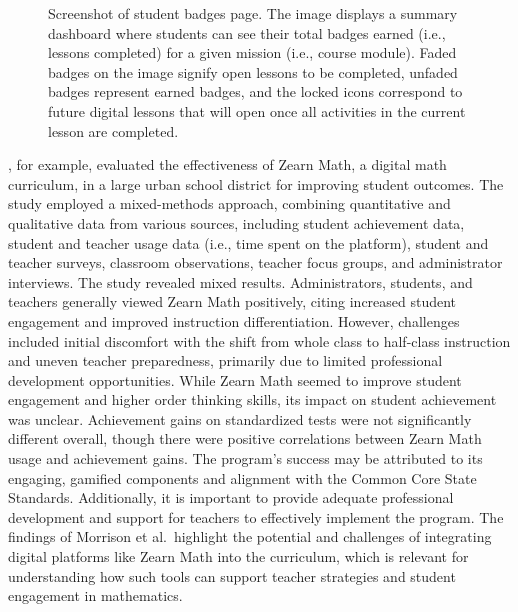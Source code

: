 \documentclass[
  number,
  preprint,
  3p,
  onecolumn]{elsarticle}
\begin{document}
\begin{figure}


\caption{\label{fig-badges-screen}Screenshot of student badges page. The
image displays a summary dashboard where students can see their total
badges earned (i.e., lessons completed) for a given mission (i.e.,
course module). Faded badges on the image signify open lessons to be
completed, unfaded badges represent earned badges, and the locked icons
correspond to future digital lessons that will open once all activities
in the current lesson are completed.}

\end{figure}%

\citep{morrison2019}, for example, evaluated the effectiveness of Zearn
Math, a digital math curriculum, in a large urban school district for
improving student outcomes. The study employed a mixed-methods approach,
combining quantitative and qualitative data from various sources,
including student achievement data, student and teacher usage data
(i.e., time spent on the platform), student and teacher surveys,
classroom observations, teacher focus groups, and administrator
interviews. The study revealed mixed results. Administrators, students,
and teachers generally viewed Zearn Math positively, citing increased
student engagement and improved instruction differentiation. However,
challenges included initial discomfort with the shift from whole class
to half-class instruction and uneven teacher preparedness, primarily due
to limited professional development opportunities. While Zearn Math
seemed to improve student engagement and higher order thinking skills,
its impact on student achievement was unclear. Achievement gains on
standardized tests were not significantly different overall, though
there were positive correlations between Zearn Math usage and
achievement gains. The program's success may be attributed to its
engaging, gamified components and alignment with the Common Core State
Standards. Additionally, it is important to provide adequate
professional development and support for teachers to effectively
implement the program. The findings of Morrison et al.~highlight the
potential and challenges of integrating digital platforms like Zearn
Math into the curriculum, which is relevant for understanding how such
tools can support teacher strategies and student engagement in
mathematics.
\end{document}
